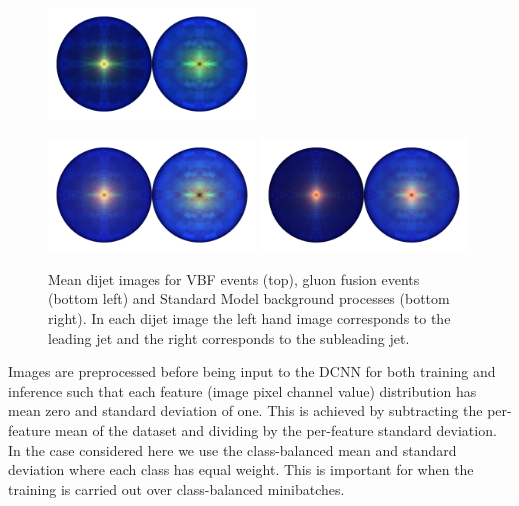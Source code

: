 \begin{figure}[h!]

    \centering
    \includegraphics[width=0.49\textwidth]{figures/event_selection/mean_vbf_LPS_uw.pdf}
    \begin{center}
        \includegraphics[width=0.49\textwidth]{figures/event_selection/mean_ggh_LPS_uw.pdf}
        \includegraphics[width=0.49\textwidth]{figures/event_selection/mean_bkg_LPS_uw.pdf}
    \end{center}
    \caption{Mean dijet images for VBF events (top), gluon fusion events (bottom left) and Standard Model background processes (bottom right). In each dijet image the left hand image corresponds to the leading jet and the right corresponds to the subleading jet.}
    \label{fig:event_categorisation:mean_jet_images}
\end{figure}

Images are preprocessed before being input to the DCNN for both training and inference such that each feature (image pixel channel value) distribution has mean zero and standard deviation of one. 
This is achieved by subtracting the per-feature mean of the dataset and dividing by the per-feature standard deviation.
In the case considered here we use the class-balanced mean and standard deviation where each class has equal weight. This is important for when the training is carried out over class-balanced minibatches.



